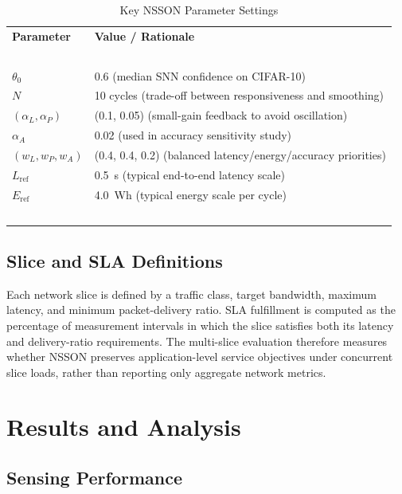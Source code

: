 \documentclass[journal]{IEEEtran}
\newcommand{\revblue}[1]{\textcolor{revblue}{#1}}
\begin{document}
\begin{table}[!t]
\centering
\color{blue}
\renewcommand{\arraystretch}{1.25}
\caption{\revblue{Key NSSON Parameter Settings}}
\label{tab:param_settings}
\begin{tabular}{p{2.0cm}p{5.8cm}}
\toprule
\textbf{Parameter} & \textbf{Value / Rationale} \\\ \\
\midrule
$\theta_0$ & 0.6 (median SNN confidence on CIFAR-10) \\
$N$ & 10 cycles (trade-off between responsiveness and smoothing) \\
$(\alpha_L,\alpha_P)$ & (0.1, 0.05) (small-gain feedback to avoid oscillation) \\
$\alpha_A$ & 0.02 (used in accuracy sensitivity study) \\
$(w_L,w_P,w_A)$ & (0.4, 0.4, 0.2) (balanced latency/energy/accuracy priorities) \\
$L_{\text{ref}}$ & 0.5~s (typical end-to-end latency scale) \\
$E_{\text{ref}}$ & 4.0~Wh (typical energy scale per cycle) \\\ \\
\bottomrule
\end{tabular}
\end{table}

\subsection{Slice and SLA Definitions}
\label{sec:sladefinitions}

Each network slice is defined by a traffic class, target bandwidth, maximum latency, and minimum packet-delivery ratio. SLA fulfillment is computed as the percentage of measurement intervals in which the slice satisfies both its latency and delivery-ratio requirements. The multi-slice evaluation therefore measures whether NSSON preserves application-level service objectives under concurrent slice loads, rather than reporting only aggregate network metrics.

\section{Results and Analysis}
\label{sec:results}

\subsection{Sensing Performance}
\end{document}
